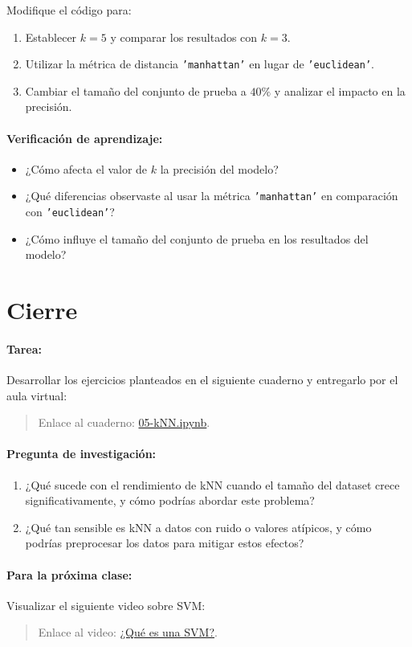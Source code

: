 \documentclass[a4,11pt]{aleph-notas}
\begin{document}
\begin{ejer}
Modifique el código para:
\begin{enumerate}[leftmargin=*]
    \item Establecer \(k = 5\) y comparar los resultados con \(k = 3\).
    \item Utilizar la métrica de distancia \texttt{'manhattan'} en lugar de \texttt{'euclidean'}.
    \item Cambiar el tamaño del conjunto de prueba a \(40\%\) y analizar el impacto en la precisión.
\end{enumerate}
\end{ejer}

\paragraph{Verificación de aprendizaje:}  
\begin{itemize}[leftmargin=*]
    \item ¿Cómo afecta el valor de \(k\) la precisión del modelo?
    \item ¿Qué diferencias observaste al usar la métrica \texttt{'manhattan'} en comparación con \texttt{'euclidean'}?
    \item ¿Cómo influye el tamaño del conjunto de prueba en los resultados del modelo?
\end{itemize}

\section*{Cierre}

\paragraph{Tarea:}
    Desarrollar los ejercicios planteados en el siguiente cuaderno y entregarlo por el aula virtual:
    \begin{quote}
        Enlace al cuaderno: \href{https://colab.research.google.com/github/andres-merino/AprendizajeAutomaticoInicial-05-N0105/blob/main/2-Ejercicios/05-kNN.ipynb}{05-kNN.ipynb}.
    \end{quote}

\paragraph{Pregunta de investigación:}  
\begin{enumerate}[leftmargin=*]
    \item ¿Qué sucede con el rendimiento de kNN cuando el tamaño del dataset crece significativamente, y cómo podrías abordar este problema?
    \item ¿Qué tan sensible es kNN a datos con ruido o valores atípicos, y cómo podrías preprocesar los datos para mitigar estos efectos?
\end{enumerate}

\paragraph{Para la próxima clase:}  
Visualizar el siguiente video sobre SVM:
    \begin{quote}
        Enlace al video: \href{https://www.youtube.com/watch?v=jo9slrXKKNo}{¿Qué es una SVM?}.
    \end{quote}
\end{document}
